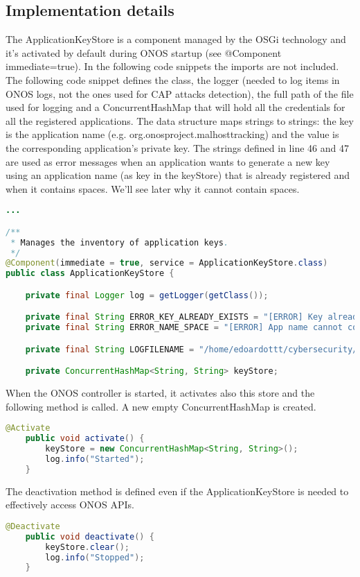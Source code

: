 \documentclass[a4paper,10pt]{memoir}
\begin{document}
\subsection{Implementation details}

The ApplicationKeyStore is a component managed by the OSGi technology and it's activated by default during ONOS startup (see @Component immediate=true). In the following code snippets the imports are not included. The following code snippet defines the class, the logger (needed to log items in ONOS logs, not the ones used for CAP attacks detection), the full path of the file used for logging and a ConcurrentHashMap that will hold all the credentials for all the registered applications. The data structure maps strings to strings: the key is the application name (e.g. org.onosproject.malhosttracking) and the value is the corresponding application's private key. The strings defined in line 46 and 47 are used as error messages when an application wants to generate a new key using an application name (as key in the keyStore) that is already registered and when it contains spaces. We'll see later why it cannot contain spaces.
\begin{lstlisting}[language=java,firstnumber=36]
...

/**
 * Manages the inventory of application keys.
 */
@Component(immediate = true, service = ApplicationKeyStore.class)
public class ApplicationKeyStore {

    private final Logger log = getLogger(getClass());

    private final String ERROR_KEY_ALREADY_EXISTS = "[ERROR] Key already exists";
    private final String ERROR_NAME_SPACE = "[ERROR] App name cannot contain spaces";

    private final String LOGFILENAME = "/home/edoardottt/cybersecurity/thesis/onos-cap/onos.log";

    private ConcurrentHashMap<String, String> keyStore;
\end{lstlisting}

When the ONOS controller is started, it activates also this store and the following method is called. A new empty ConcurrentHashMap is created.
\begin{lstlisting}[language=java,firstnumber=53]
    @Activate
    public void activate() {
        keyStore = new ConcurrentHashMap<String, String>();
        log.info("Started");
    }
\end{lstlisting}

The deactivation method is defined even if the ApplicationKeyStore is needed to effectively access ONOS APIs.
\begin{lstlisting}[language=java,firstnumber=60]
    @Deactivate
    public void deactivate() {
        keyStore.clear();
        log.info("Stopped");
    }
\end{lstlisting}
\end{document}
